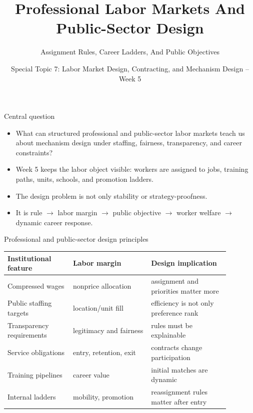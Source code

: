\documentclass[aspectratio=169,11pt]{beamer}
\title{Professional Labor Markets And Public-Sector Design}
\subtitle{Assignment Rules, Career Ladders, And Public Objectives}
\author{Special Topic 7: Labor Market Design, Contracting, and Mechanism Design -- Week 5}
\date{}
\begin{document}
\begin{frame}
  \titlepage
\end{frame}

\begin{frame}{Central question}
\begin{itemize}
    \item What can structured professional and public-sector labor markets teach us about mechanism design under staffing, fairness, transparency, and career constraints?
    \item Week 5 keeps the labor object visible: workers are assigned to jobs, training paths, units, schools, and promotion ladders.
    \item The design problem is not only stability or strategy-proofness.
    \item It is rule $\rightarrow$ labor margin $\rightarrow$ public objective $\rightarrow$ worker welfare $\rightarrow$ dynamic career response.
\end{itemize}
\end{frame}

\begin{frame}{Professional and public-sector design principles}
\small
\begin{tabular}{p{0.26\linewidth} p{0.31\linewidth} p{0.31\linewidth}}
\toprule
Institutional feature & Labor margin & Design implication \\
\midrule
Compressed wages & nonprice allocation & assignment and priorities matter more \\
Public staffing targets & location/unit fill & efficiency is not only preference rank \\
Transparency requirements & legitimacy and fairness & rules must be explainable \\
Service obligations & entry, retention, exit & contracts change participation \\
Training pipelines & career value & initial matches are dynamic \\
Internal ladders & mobility, promotion & reassignment rules matter after entry \\
\bottomrule
\end{tabular}
\end{frame}
\end{document}
